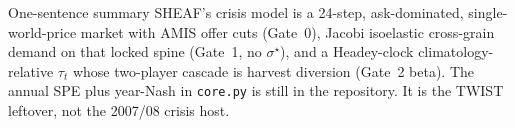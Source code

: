 \begin{frame}{One-sentence summary}
\hyperlink{sitmap}{}
\vspace{0.3em}
SHEAF's crisis model is a 24-step, ask-dominated, single-world-price
market with AMIS offer cuts (Gate~0), Jacobi isoelastic cross-grain
demand on that locked spine (Gate~1, no $\sigma^\star$), and a
Headey-clock climatology-relative $\tau_t$ whose two-player cascade is
harvest diversion (Gate~2 beta). The annual SPE plus year-Nash in
\texttt{core.py} is still in the repository. It is the TWIST leftover,
not the 2007/08 crisis host.
\end{frame}
